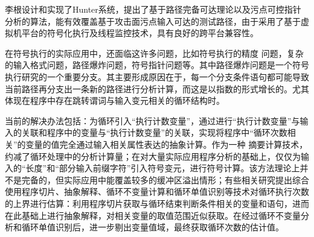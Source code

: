 %


李根设计和实现了Hunter系统，提出了基于路径完备可达理论以及污点可控指针分析的算法，能有效覆盖基于攻击面污点输入可达的测试路径，由于采用了基于虚拟机平台的符号化执行及线程监控技术，具有良好的跨平台兼容性。

在符号执行的实际应用中，还面临这许多问题，比如符号执行的精度
问题，复杂的输入格式问题，路径爆炸问题，符号指针问题等。其中路径爆炸问题是一个符号执行研究的一个重要分支。其主要形成原因在于，每一个分支条件语句都可能导致当前路径再分支出一条新的路径进行分析计算，而这是以指数的形式增长的。尤其体现在程序中存在跳转谓词与输入变元相关的循环结构时。

当前的解决办法包括：为循环引入“执行计数变量”，通过进行“执行计数变量”与输入的关联和程序中的变量与“执行计数变量”的关联，实现将程序中“循环次数相关”的变量的值完全通过输入相关属性表达的抽象计算。作为一种
摘要计算技术，约减了循环处理中的分析计算量；在对大量实际应用程序分析的基础上，仅仅为输入的“长度”和“部分输入前缀字符”引入符号变元，进行符号计算。该方法理论上并不是完备的，但实际应用中能覆盖较多的缓冲区溢出情形；有些相关研究提出综合使用程序切片、抽象解释、循环不变量计算和循环单值识别等技术对循环执行次数的上界进行估算：利用程序切片获取与循环结束判断条件相关的变量和语句，进而在此基础上进行抽象解释，对相关变量的取值范围近似获取。在经过循环不变量分析和循环单值识别后，进一步剔出变量值域，最终获取循环次数的估计值。

